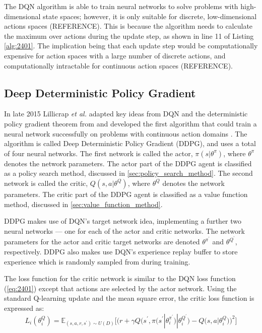The DQN algorithm is able to train neural networks to solve problems with high-dimensional state spaces; however, it is only suitable for discrete, low-dimensional actions spaces (REFERENCE). This is because the algorithm needs to calculate the maximum over actions during the update step, as shown in line 11 of Listing \ref{alg:2401}. The implication being that each update step would be computationally expensive for action spaces with a large number of discrete actions, and computationally intractable for continuous action spaces (REFERENCE).

\subsection{Deep Deterministic Policy Gradient}\label{ssec:deep_deterministic_policy_gradient}
In late 2015 Lillicrap \textit{et al.} adapted key ideas from DQN and the deterministic policy gradient theorem from \cite{Silver2014} and developed the first algorithm that could train a neural network successfully on problems with continuous action domains \cite{Lillicrap2015}. The algorithm is called Deep Deterministic Policy Gradient (DDPG), and uses a total of four neural networks. The first network is called the actor, $\pi(s|\theta^{\pi})$, where $\theta^{\pi}$ denotes the network parameters. The actor part of the DDPG agent is classified as a policy search method, discussed in \textsection \ref{sec:policy_search_method}. The second network is called the critic, $Q(s,a|\theta^{Q})$, where $\theta^Q$ denotes the network parameters. The critic part of the DDPG agent is classified as a value function method, discussed in \textsection \ref{sec:value_function_method}.

DDPG makes use of DQN's target network idea, implementing a further two neural networks --- one for each of the actor and critic networks. The network parameters for the actor and critic target networks are denoted $\theta^{\pi^\prime}$ and $\theta^{Q^\prime}$, respectively. DDPG also makes use DQN's experience replay buffer to store experience which is randomly sampled from during training.

The loss function for the critic network is similar to the DQN loss function (\ref{eq:2401}) except that actions are selected by the actor network. Using the standard Q-learning update and the mean square error, the critic loss function is expressed as:
\begin{equation}
	L_i(\theta^Q_i) = \mathbb{E}_{(s,a,r,s^\prime) \sim U(D)} \bigg[ \bigg( r + \gamma Q \big(s^\prime, \pi\big(s^\prime | \theta^{\pi^\prime}_i \big) | \theta^{Q^\prime}_i \big) - Q \big(s,a | \theta^Q_i \big) \bigg)^2 \bigg]
\end{equation}\label{eq:2402}

